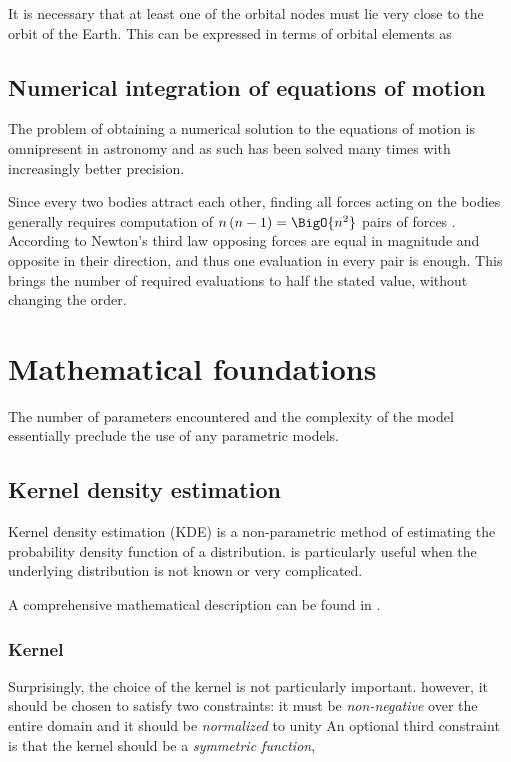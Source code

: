     It is necessary that at least one of the orbital nodes must lie very close to the orbit of the Earth.
    This can be expressed in terms of orbital elements as


    \subsection{Numerical integration of equations of motion} \label{msi}
        The problem of obtaining a numerical solution to the equations of motion is omnipresent
        in astronomy and as such has been solved many times with increasingly better precision.

        Since every two bodies attract each other, finding all forces acting on the bodies generally
        requires computation of $n\left(n - 1\right) = \BigO{n^2}$ pairs of forces \cite{???}.
        According to Newton's third law opposing forces are equal in magnitude and opposite in their direction,
        and thus one evaluation in every pair is enough. This brings the number of required evaluations to half the stated value,
        without changing the order.

\section{Mathematical foundations} \label{mm}

    The number of parameters encountered and the complexity of the model essentially preclude the use of any parametric models.

    \subsection{Kernel density estimation} \label{mmk}
        Kernel density estimation (KDE) is a non-parametric method of estimating the probability density function
        of a distribution.
        is particularly useful when the underlying distribution is not known or very complicated.

        A comprehensive mathematical description can be found in \citep{hwang+1994}.

        \subsubsection{Kernel} \label{mmkk}
            Surprisingly, the choice of the kernel is not particularly important.
            however, it should be chosen to satisfy two constraints: it must be
            \emph{non-negative} over the entire domain
            and it should be \emph{normalized} to unity
            An optional third constraint is that the kernel should be a \emph{symmetric function},

